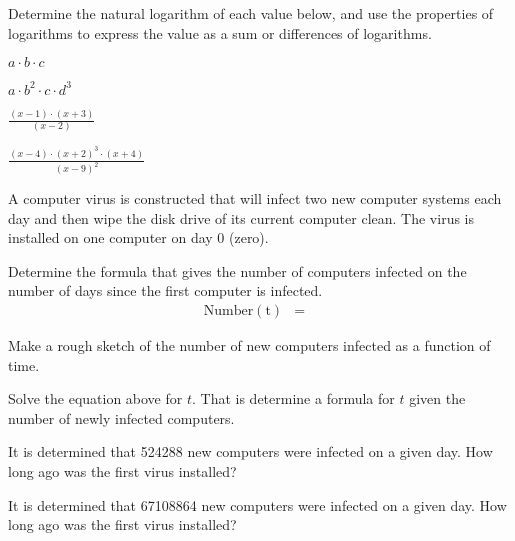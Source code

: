 \begin{problem}
\item Determine the natural logarithm of each value below, and use the
  properties of logarithms to express the value as a sum or
  differences of logarithms.
  \begin{subproblem}
  \item $a\cdot b \cdot c$
    \vfill
  \item $a\cdot b^2 \cdot c \cdot d^3$
    \vfill
  \item $\frac{(x-1)\cdot (x+3)}{(x-2)}$
    \vfill
  \item $\frac{(x-4)\cdot (x+2)^3 \cdot (x+4)}{(x-9)^2}$
    \vfill
  \end{subproblem}

\clearpage

\item A computer virus is constructed that will infect two new
  computer systems each day and then wipe the disk drive of its
  current computer clean.  The virus is installed on one computer on
  day 0 (zero).
  \begin{subproblem}
    \item Determine the formula that gives the number of computers
      infected on the number of days since the first computer is
      infected.
      \begin{eqnarray*}
        \mathrm{Number(t)} & = &
      \end{eqnarray*}
    \item Make a rough sketch of the number of new computers infected
      as a function of time.
      \vfill
    \item Solve the equation above for $t$. That is determine a formula for
      $t$ given the number of newly infected computers.
      \vfill
    \item It is determined that 524288 new computers were infected on
      a given day. How long ago was the first virus installed?
      \vspace{3em}
    \item It is determined that 67108864 new computers were infected
      on a given day. How long ago was the first virus installed?
      \vspace{3em}
  \end{subproblem}

\clearpage


\end{problem}
